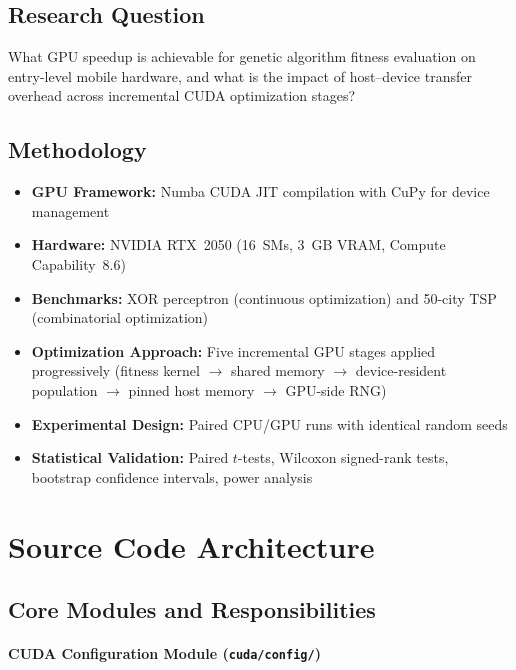 \documentclass[a4paper,14pt]{extarticle}
\begin{document}
\subsection{Research Question}

What GPU speedup is achievable for genetic algorithm fitness evaluation on entry-level mobile
hardware, and what is the impact of host--device transfer overhead across incremental CUDA
optimization stages?

\subsection{Methodology}

\begin{itemize}
  \item \textbf{GPU Framework:} Numba CUDA JIT compilation with CuPy for device management
  \item \textbf{Hardware:} NVIDIA RTX~2050 (16~SMs, 3~GB VRAM, Compute Capability~8.6)
  \item \textbf{Benchmarks:} XOR perceptron (continuous optimization) and 50-city TSP
        (combinatorial optimization)
  \item \textbf{Optimization Approach:} Five incremental GPU stages applied progressively
        (fitness kernel $\to$ shared memory $\to$ device-resident population $\to$ pinned
        host memory $\to$ GPU-side RNG)
  \item \textbf{Experimental Design:} Paired CPU/GPU runs with identical random seeds
  \item \textbf{Statistical Validation:} Paired $t$-tests, Wilcoxon signed-rank tests,
        bootstrap confidence intervals, power analysis
\end{itemize}


\section{Source Code Architecture}

\subsection{Core Modules and Responsibilities}

\paragraph{CUDA Configuration Module (\texttt{cuda/config/})}
\end{document}
